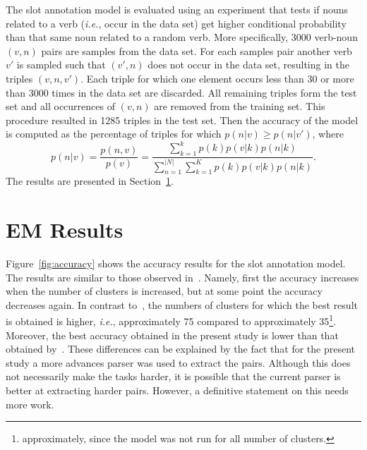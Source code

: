 \documentclass[11pt]{scrartcl}
\newcommand{\ie}{\textit{i.e.}}
\begin{document}
The slot annotation model is evaluated using an experiment that tests
if nouns related to a verb (\ie, occur in the data set) get higher
conditional probability than that same noun related to a random
verb. More specifically, 3000 verb-noun $(v, n)$ pairs are samples
from the data set. For each samples pair another verb $v'$ is sampled
such that $(v', n)$ does not occur in the data set, resulting in the
triples $(v, n , v')$. Each triple for which one element occurs less
than 30 or more than 3000 times in the data set are discarded. All
remaining triples form the test set and all occurrences of $(v, n)$
are removed from the training set. This procedure resulted in 1285
triples in the test set. Then the accuracy of the model is computed as
the percentage of triples for which $p(n|v) \ge p(n|v')$, where
\[
  p(n|v) = \frac{p(n, v)}{p(v)} =
  \frac{\sum_{k=1}^k p(k)p(v|k)p(n|k)}{\sum_{n=1}^{|N|}\sum_{k=1}^K p(k)p(v|k)p(n|k)}.
\]
The results are presented in Section~\ref{sec:results}.

\section{EM Results} %
\label{sec:results}
Figure~\ref{fig:accuracy} shows the accuracy results for the slot
annotation model. The results are similar to those observed
in~\cite{rooth1999inducing}. Namely, first the accuracy increases when
the number of clusters is increased, but at some point the accuracy
decreases again. In contrast to~\cite{rooth1999inducing}, the numbers
of clusters for which the best result is obtained is higher, \ie,
approximately 75 compared to approximately 35\footnote{approximately,
since the model was not run for all number of clusters.}. Moreover,
the best accuracy obtained in the present study is lower than that
obtained by~\cite{rooth1999inducing}. These differences can be
explained by the fact that for the present study a more advances
parser was used to extract the pairs. Although this does not
necessarily make the tasks harder, it is possible that the current
parser is better at extracting harder pairs. However, a definitive
statement on this needs more work.
\end{document}
